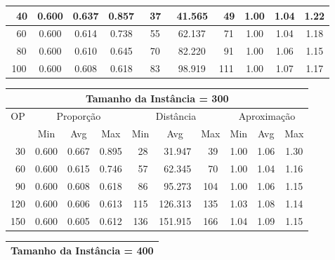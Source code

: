 \begin{table}[!tb]
\begin{center}
{\begin{tabular}{|c|c|c|c|c|c|c|c|c|c|}
~40                 & 0.600     & 0.637    & 0.857    & ~37      & ~41.565  & ~49     & 1.00    & 1.04   & 1.22            \\ \hline
~60                 & 0.600     & 0.614    & 0.738    & ~55      & ~62.137  & ~71     & 1.00    & 1.04   & 1.18            \\ \hline
~80                 & 0.600     & 0.610    & 0.645    & ~70      & ~82.220  & ~91     & 1.00    & 1.06   & 1.15            \\ \hline
100                 & 0.600     & 0.608    & 0.618    & ~83      & ~98.919  & 111     & 1.00    & 1.07   & 1.17            \\ \hline
\end{tabular}%
\vspace{5pt}
\begin{tabular}{|c|c|c|c|c|c|c|c|c|c|}
\hline
\multicolumn{10}{|c|}{\bf Tamanho da Instância = 300}                                                                          \\ \hline
\multirow{2}{*}{OP} & \multicolumn{3}{c|}{Proporção} & \multicolumn{3}{c|}{Distância} & \multicolumn{3}{c|}{Aproximação}   \\ \cline{2-10}
                    & Min       & Avg      & Max      & Min      & Avg      & Max     & Min     & Avg    & Max             \\ \hline
~30                 & 0.600     & 0.667    & 0.895    & ~28      & ~31.947  & ~39     & 1.00    & 1.06   & 1.30            \\ \hline
~60                 & 0.600     & 0.615    & 0.746    & ~57      & ~62.345  & ~70     & 1.00    & 1.04   & 1.16            \\ \hline
~90                 & 0.600     & 0.608    & 0.618    & ~86      & ~95.273  & 104     & 1.00    & 1.06   & 1.15            \\ \hline
120                 & 0.600     & 0.606    & 0.613    & 115      & 126.313  & 135     & 1.03    & 1.08   & 1.14            \\ \hline
150                 & 0.600     & 0.605    & 0.612    & 136      & 151.915  & 166     & 1.04    & 1.09   & 1.15            \\ \hline
\end{tabular}%
\vspace{5pt}
\begin{tabular}{|c|c|c|c|c|c|c|c|c|c|}
\hline
\multicolumn{10}{|c|}{\bf Tamanho da Instância = 400}                                                                          \\ \hline

\end{tabular}}
\end{center}
\end{table}
